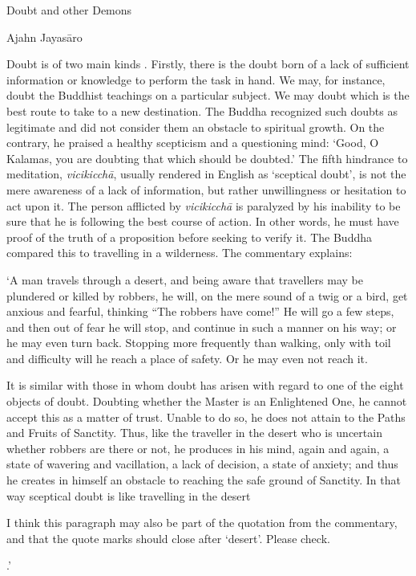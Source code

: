 Doubt and other Demons

Ajahn Jayasāro

Doubt is of two main kinds . Firstly, there is the doubt born of a lack
of sufficient information or knowledge to perform the task in hand. We
may, for instance, doubt the Buddhist teachings on a particular subject.
We may doubt which is the best route to take to a new destination. The
Buddha recognized such doubts as legitimate and did not consider them an
obstacle to spiritual growth. On the contrary, he praised a healthy
scepticism and a questioning mind: `Good, O Kalamas, you are doubting
that which should be doubted.' The fifth hindrance to meditation,
\emph{vicikicchā}, usually rendered in English as `sceptical doubt', is
not the mere awareness of a lack of information, but rather
unwillingness or hesitation to act upon it. The person afflicted by
\emph{vicikicchā} is paralyzed by his inability to be sure that he is
following the best course of action. In other words, he must have proof
of the truth of a proposition before seeking to verify it. The Buddha
compared this to travelling in a wilderness. The commentary explains:

`A man travels through a desert, and being aware that travellers may be
plundered or killed by robbers, he will, on the mere sound of a twig or
a bird, get anxious and fearful, thinking ``The robbers have come!'' He
will go a few steps, and then out of fear he will stop, and continue in
such a manner on his way; or he may even turn back. Stopping more
frequently than walking, only with toil and difficulty will he reach a
place of safety. Or he may even not reach it.

It is similar with those in whom doubt has arisen with regard to one of
the eight objects of doubt. Doubting whether the Master is an
Enlightened One, he cannot accept this as a matter of trust. Unable to
do so, he does not attain to the Paths and Fruits of Sanctity. Thus,
like the traveller in the desert who is uncertain whether robbers are
there or not, he produces in his mind, again and again, a state of
wavering and vacillation, a lack of decision, a state of anxiety; and
thus he creates in himself an obstacle to reaching the safe ground of
Sanctity. In that way sceptical doubt is like travelling in the desert

I think this paragraph may also be part of the quotation from the
commentary, and that the quote marks should close after `desert'. Please
check.

.'

